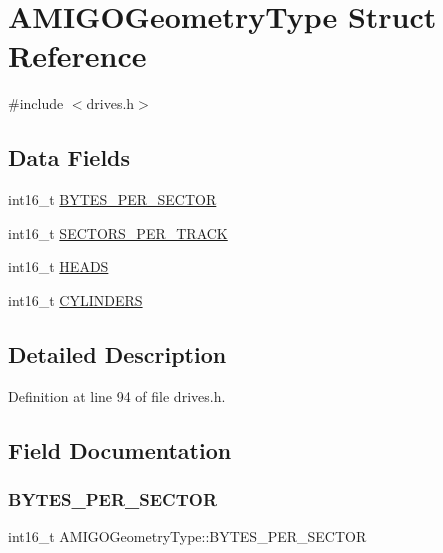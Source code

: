 \hypertarget{structAMIGOGeometryType}{}\section{A\+M\+I\+G\+O\+Geometry\+Type Struct Reference}
\label{structAMIGOGeometryType}


{\ttfamily \#include $<$drives.\+h$>$}

\subsection*{Data Fields}
\begin{DoxyCompactItemize}
\item 
int16\+\_\+t \hyperlink{structAMIGOGeometryType_a446d9194981ebd7af3c1b11cdbdf0cfd}{B\+Y\+T\+E\+S\+\_\+\+P\+E\+R\+\_\+\+S\+E\+C\+T\+OR}
\item 
int16\+\_\+t \hyperlink{structAMIGOGeometryType_ac19c5a32ffb2f05ebb00c64cac0903ee}{S\+E\+C\+T\+O\+R\+S\+\_\+\+P\+E\+R\+\_\+\+T\+R\+A\+CK}
\item 
int16\+\_\+t \hyperlink{structAMIGOGeometryType_a0c058525ff9c043708a0773eec513dbf}{H\+E\+A\+DS}
\item 
int16\+\_\+t \hyperlink{structAMIGOGeometryType_a5a0d5f6611aeb7db58ff4a851bde8fcf}{C\+Y\+L\+I\+N\+D\+E\+RS}
\end{DoxyCompactItemize}


\subsection{Detailed Description}


Definition at line 94 of file drives.\+h.



\subsection{Field Documentation}
\mbox{\label{structAMIGOGeometryType_a446d9194981ebd7af3c1b11cdbdf0cfd}} 
\subsubsection{\texorpdfstring{B\+Y\+T\+E\+S\+\_\+\+P\+E\+R\+\_\+\+S\+E\+C\+T\+OR}{BYTES\_PER\_SECTOR}}
{\footnotesize\ttfamily int16\+\_\+t A\+M\+I\+G\+O\+Geometry\+Type\+::\+B\+Y\+T\+E\+S\+\_\+\+P\+E\+R\+\_\+\+S\+E\+C\+T\+OR}



